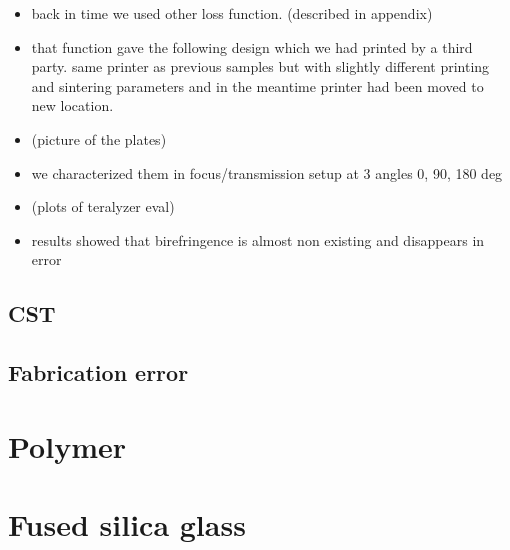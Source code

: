 \begin{itemize}
    \item back in time we used other loss function. (described in appendix)
    \item that function gave the following design which we had printed by a third party.
    same printer as previous samples but with slightly different printing and sintering parameters and in the meantime printer had been moved to new location.
    \item (picture of the plates)
    \item we characterized them in focus/transmission setup at 3 angles 0, 90, 180 deg
    \item (plots of teralyzer eval)
    \item results showed that birefringence is almost non existing and disappears in error
\end{itemize}


\subsection{CST}
\subsection{Fabrication error}

\section{Polymer}

\section{Fused silica glass}



